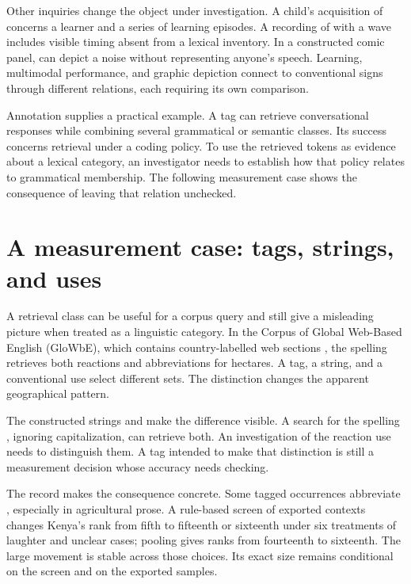 \documentclass[12pt]{article}
\begin{document}
Other inquiries change the object under investigation. A child's acquisition
of  concerns a learner and a series of learning episodes.
A recording of  with a wave includes visible timing absent
from a lexical inventory. In a constructed comic panel, 
can depict a noise without representing anyone's speech. Learning,
multimodal performance, and graphic depiction connect to conventional signs
through different relations, each requiring its own comparison.

Annotation supplies a practical example. A tag can retrieve conversational
responses while combining several grammatical or semantic classes. Its
success concerns retrieval under a coding policy. To use the retrieved
tokens as evidence about a lexical category, an investigator needs
to establish how that policy relates to grammatical membership. The
following measurement case shows the consequence of leaving that relation
unchecked.

\section{A measurement case: tags, strings, and uses}\label{sec:evidence}

A retrieval class can be useful for a corpus query and still give
a misleading picture when treated as a linguistic category. In the
Corpus of Global Web-Based English (GloWbE), which contains country-labelled
web sections \citep{daviesfuchs2015}, the spelling  retrieves
both reactions and abbreviations for hectares. A tag, a string, and
a conventional use select different sets. The distinction changes the
apparent geographical pattern.

The constructed strings  and  make the difference visible. A search for the spelling
, ignoring capitalization, can retrieve both. An investigation
of the reaction use needs to distinguish them. A tag intended to
make that distinction is still a measurement decision whose accuracy
needs checking.

The  record makes the consequence concrete. Some tagged
occurrences abbreviate , especially in agricultural prose.
A rule-based screen of exported contexts changes Kenya's rank from fifth
to fifteenth or sixteenth under six treatments of laughter and unclear
cases; pooling gives ranks from fourteenth to sixteenth. The large
movement is stable across those choices. Its exact size remains
conditional on the screen and on the exported samples.
\end{document}
